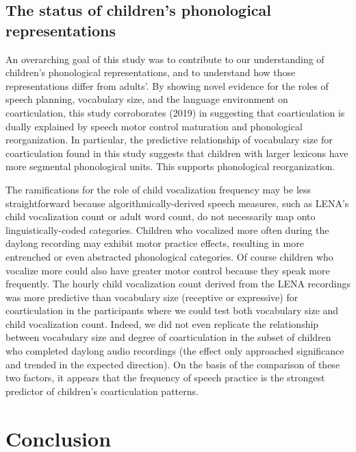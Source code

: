 \documentclass[a4paper,man,natbib,donotrepeattitle, apacite]{apa6}
\begin{document}
\subsection{The status of children’s phonological representations}

An overarching goal of this study was to contribute to our understanding of children’s phonological representations, and to understand how those representations differ from adults’. By showing novel evidence for the roles of speech planning, vocabulary size, and the language environment on coarticulation, this study corroborates \citeauthor{noiraySpokenLanguageDevelopment2019} (2019) in suggesting that coarticulation is dually explained by speech motor control maturation and phonological reorganization. In particular, the predictive relationship of vocabulary size for coarticulation found in this study suggests that children with larger lexicons have more segmental phonological units. This supports phonological reorganization. 

The ramifications for the role of child vocalization frequency may be less straightforward because algorithmically-derived speech measures, such as LENA’s child vocalization count or adult word count, do not necessarily map onto linguistically-coded categories. Children who vocalized more often during the daylong recording may exhibit motor practice effects, resulting in more entrenched or even abstracted phonological categories. Of course children who vocalize more could also have greater motor control because they speak more frequently. The hourly child vocalization count derived from the LENA recordings was more predictive than vocabulary size (receptive or expressive) for coarticulation in the participants where we could test both vocabulary size and child vocalization count. Indeed, we did not even replicate the relationship between vocabulary size and degree of coarticulation in the subset of children who completed daylong audio recordings (the effect only approached significance and trended in the expected direction). On the basis of the comparison of these two factors, it appears that the frequency of speech practice is the strongest predictor of children’s coarticulation patterns. 

\section{Conclusion}
\end{document}
